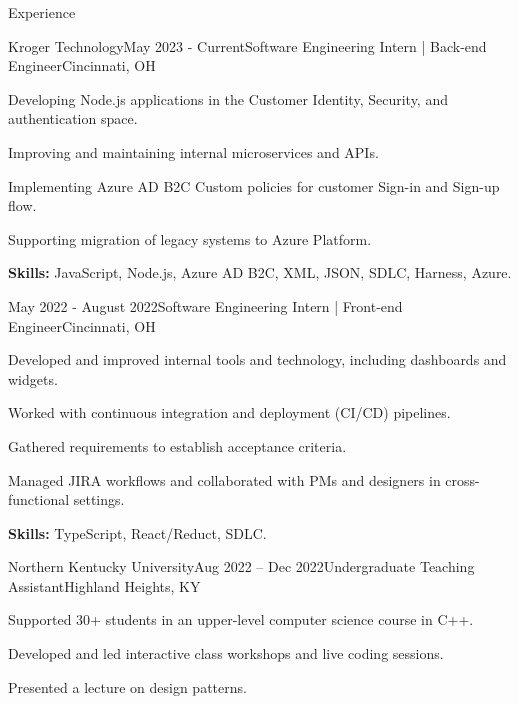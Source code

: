 \documentclass[11pt]{resume}
\begin{document}
\begin{rSection}{Experience}

	\begin{rSubsection}{Kroger Technology}{May 2023 - Current}{Software Engineering Intern | Back-end Engineer}{Cincinnati, OH}
        \item Developing Node.js applications in the Customer Identity, Security, and authentication space. 
        \item Improving and maintaining internal microservices and APIs.
        \item Implementing Azure AD B2C Custom policies for customer Sign-in and Sign-up flow.
        \item Supporting migration of legacy systems to Azure Platform.
	\end{rSubsection}
    \vspace*{-5pt}
    \noindent\textbf{Skills:} JavaScript, Node.js, Azure AD B2C, XML, JSON, SDLC, Harness, Azure.
    
    \begin{rSubsection}{}{May 2022 - August 2022}{Software Engineering Intern | Front-end Engineer}{Cincinnati, OH}
        \item Developed and improved internal tools and technology, including dashboards and widgets.
        \item Worked with continuous integration and deployment (CI/CD) pipelines.
        \item Gathered requirements to establish acceptance criteria.
        \item Managed JIRA workflows and collaborated with PMs and designers in cross-functional settings.
    \end{rSubsection}
    \vspace*{-5pt}
    \noindent\textbf{Skills:} TypeScript, React/Reduct, SDLC.

    \vspace*{5pt}
    \begin{rSubsection}{Northern Kentucky University}{Aug 2022 – Dec 2022}{Undergraduate Teaching Assistant}{Highland Heights, KY}
        \item Supported 30+ students in an upper-level computer science course in C++.
        \item Developed and led interactive class workshops and live coding sessions.
        \item Presented a lecture on design patterns.
    \end{rSubsection}
    

\end{rSection}
\end{document}

